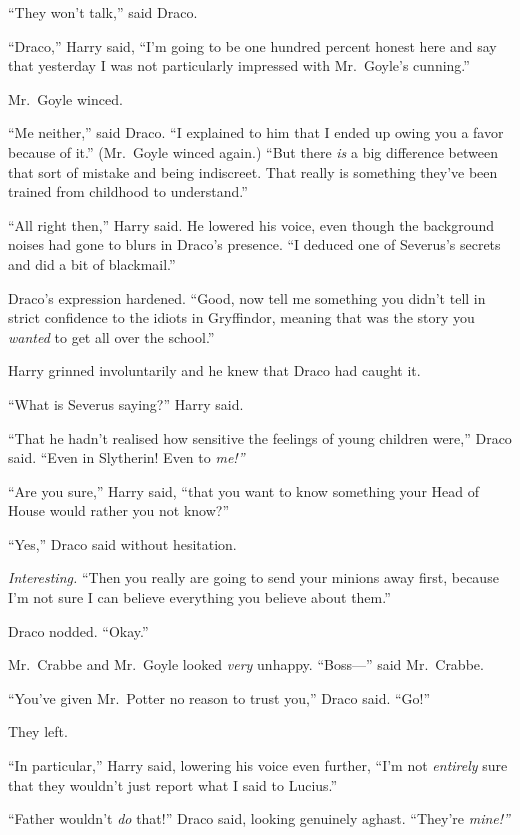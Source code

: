 ``They won't talk,'' said Draco.

``Draco,'' Harry said, ``I'm going to be one hundred percent honest here
and say that yesterday I was not particularly impressed with Mr.~Goyle's
cunning.''

Mr.~Goyle winced.

``Me neither,'' said Draco. ``I explained to him that I ended up owing
you a favor because of it.'' (Mr.~Goyle winced again.) ``But there
\emph{is} a big difference between that sort of mistake and being
indiscreet. That really is something they've been trained from childhood
to understand.''

``All right then,'' Harry said. He lowered his voice, even though the
background noises had gone to blurs in Draco's presence. ``I deduced one
of Severus's secrets and did a bit of blackmail.''

Draco's expression hardened. ``Good, now tell me something you didn't
tell in strict confidence to the idiots in Gryffindor, meaning that was
the story you \emph{wanted} to get all over the school.''

Harry grinned involuntarily and he knew that Draco had caught it.

``What is Severus saying?'' Harry said.

``That he hadn't realised how sensitive the feelings of young children
were,'' Draco said. ``Even in Slytherin! Even to \emph{me!''}

``Are you sure,'' Harry said, ``that you want to know something your
Head of House would rather you not know?''

``Yes,'' Draco said without hesitation.

\emph{Interesting.} ``Then you really are going to send your minions
away first, because I'm not sure I can believe everything you believe
about them.''

Draco nodded. ``Okay.''

Mr.~Crabbe and Mr.~Goyle looked \emph{very} unhappy. ``Boss---'' said
Mr.~Crabbe.

``You've given Mr.~Potter no reason to trust you,'' Draco said. ``Go!''

They left.

``In particular,'' Harry said, lowering his voice even further, ``I'm
not \emph{entirely} sure that they wouldn't just report what I said to
Lucius.''

``Father wouldn't \emph{do} that!'' Draco said, looking genuinely
aghast. ``They're \emph{mine!''}

